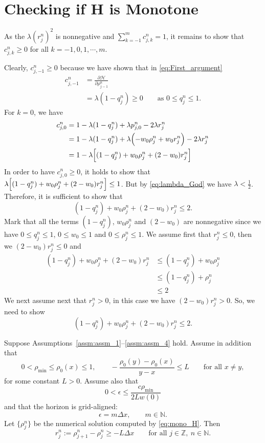 \section{ Checking if H is Monotone}




As the $\lambda(r_j^n)^2$ is nonnegative and $\sum_{k=-1}^m c_{j,k}^n = 1$, it remains to show that $c_{j,k}^n \geq 0$ for all $k= -1, 0,1, \cdots, m.$

Clearly, $c_{j,-1}^n \geq 0$ because we have shown that in \eqref{eq:First_argument}
\begin{align*}
    c_{j,-1}^n & =\frac{\partial \mathcal{H}}{\partial \rho_{j-1}^n}              \\
               & = \lambda(1-q_j^n) \geq 0 \qquad \text{as } 0 \leq q_j^n \leq 1.
\end{align*}
For $k= 0$, we have
\begin{align*}
    c_{j,0}^n & = 1 - \lambda (1- q_j^n) + \lambda p_{j,0}^n -2\lambda r_j^n                            \\
              & = 1 - \lambda (1- q_j^n) + \lambda \Bigl(-w_0\rho_j^n + w_0 r_j^n\Bigr) -2\lambda r_j^n \\
              & = 1- \lambda \Bigl[(1- q_j^n)+ w_0\rho_j^n  + (2-w_0)r_j^n\Bigr]
\end{align*}
In order to have  $c_{j,0}^n \geq 0$, it holds to show that $\lambda \Bigl[(1- q_j^n)+ w_0\rho_j^n  + (2-w_0)r_j^n\Bigr] \leq 1$. But by \eqref{eq:lambda_God} we have $\lambda < \frac{1}{2}$. Therefore, it is sufficient to show that
\[
    (1- q_j^n)+ w_0\rho_j^n  + (2-w_0)r_j^n \leq 2.
\]
Mark that all the terms $(1- q_j^n)$, $w_0\rho_j^n$ and $(2-w_0)$ are nonnegative since we have $ 0\leq q_j^n \leq 1$,  $0 \leq  w_0 \leq 1$ and  $0\leq \rho_j^n \leq 1$. We assume first that $r_j^n \leq 0$, then we $(2-w_0)r_j^n \leq 0$ and
\begin{align*}
    (1- q_j^n)+ w_0\rho_j^n  + (2-w_0)r_j^n & \leq (1- q_j^n)+ w_0\rho_j^n \\
                                            & \leq (1- q_j^n)+ \rho_j^n    \\
                                            & \leq 2
\end{align*}
We next assume next that $r_j^n > 0$, in this case we have $(2-w_0)r_j^n > 0$. So, we need to show
\[
    (1- q_j^n)+ w_0\rho_j^n  + (2-w_0)r_j^n \leq 2.
\]



\begin{lemma}\label{lem:lemma_1}
    Suppose Assumptions~\ref{assm:assm_1}--\ref{assm:assm_4} hold.
    Assume in addition that
    \[
        0<\rho_{\min}\le \rho_0(x)\le 1,
        \qquad
        -\frac{\rho_0(y)-\rho_0(x)}{y-x}\le L
        \qquad \text{for all }x\ne y,
    \]
    for some constant \(L>0\). Assume also that
    \[
        0<\epsilon\le \frac{c\rho_{\min}}{2Lw(0)}
    \]
    and that the horizon is grid-aligned:
    \[
        \epsilon=m\Delta x,\qquad m\in\mathbb N.
    \]
    Let \(\{\rho_j^n\}\) be the numerical solution computed by \eqref{eq:mono_H}.
    Then
    \[
        r_j^n:=\rho_{j+1}^n-\rho_j^n\ge -L\Delta x
        \qquad \text{for all }j\in\mathbb Z,\ n\in\mathbb N.
    \]
\end{lemma}


